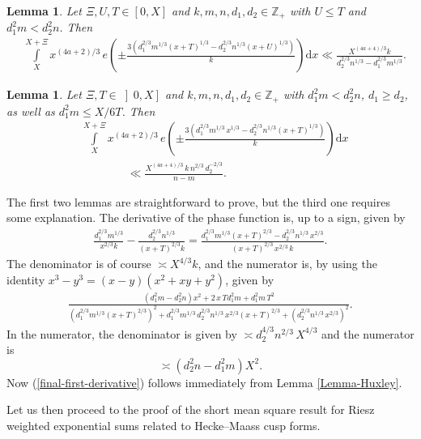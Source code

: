 \documentclass[a4paper,10pt,twoside]{amsart}
\newtheorem{lemma}[theorem]{Lemma}
\theoremstyle{definition}
\numberwithin{equation}{section}
\renewcommand\:{\colon}
\begin{document}
\begin{lemma}\label{first-derivative-2}
Let $\Xi,U,T\in\left[0,X\right]$ and $k,m,n,d_1,d_2\in\mathbb Z_+$ with $U\leqslant T$ and $d_1^2m<d_2^2n$. Then
\begin{align*}
&\int\limits_X^{X+\Xi}x^{(4a+2)/3}\,e\!\left(\pm\frac{3\!\left(d_1^{2/3}m^{1/3}\left(x+T\right)^{1/3}-d_2^{2/3}n^{1/3}\left(x+U\right)^{1/3}\right)}k\right)\mathrm dx \ll\frac{X^{(4a+4)/3}k}{d_2^{2/3}n^{1/3}-d_1^{2/3}m^{1/3}}.
\end{align*}
\end{lemma}

\begin{lemma}\label{first-derivative-3}
Let $\Xi,T\in\left]0,X\right]$ and $k,m,n,d_1,d_2\in\mathbb Z_+$ with $d_1^2m<d_2^2n$, $d_1\geqslant d_2$, as well as $d_1^2 m\leqslant X/6T$. Then
\begin{align}\label{final-first-derivative}
&\int\limits_X^{X+\Xi}x^{(4a+2)/3}\,e\!\left(\pm\frac{3\!\left(d_1^{2/3}m^{1/3}\,x^{1/3}-d_2^{2/3}n^{1/3}\left(x+T\right)^{1/3}\right)}k\right)\mathrm dx \nonumber \\
&\qquad\qquad\ll\frac{X^{(4a+4)/3}\,k\,n^{2/3}\,d_2^{-2/3}}{n-m}.
\end{align}
\end{lemma}

\noindent The first two lemmas are straightforward to prove, but the third one requires some explanation. The derivative of the phase function is, up to a sign, given by
\begin{align*}
\frac{d_1^{2/3}m^{1/3}}{x^{2/3}k}-\frac{d_2^{2/3}n^{1/3}}{(x+T)^{2/3}k}
=\frac{d_1^{2/3}m^{1/3}\left(x+T\right)^{2/3}-d_2^{2/3}n^{1/3}\,x^{2/3}}{\left(x+T\right)^{2/3}\,x^{2/3}\,k}.
\end{align*}
The denominator is of course $\asymp X^{4/3}k$, and the numerator is, by using the identity $x^3-y^3=(x-y)(x^2+xy+y^2)$, given by
\begin{align*}
\frac{\left(d_1^2m-d_2^2n\right)x^2+2\,x\,Td_1^2m+d_1^2m\,T^2}{\left(d_1^{2/3}m^{1/3}\left(x+T\right)^{2/3}\right)^2+
d_1^{2/3}m^{1/3}\,d_2^{2/3}n^{1/3}\,x^{2/3}\left(x+T\right)^{2/3}
+\left(d_2^{2/3}n^{1/3}\,x^{2/3}\right)^2}.
\end{align*}
In the numerator, the denominator is given by $\asymp d_2^{4/3}n^{2/3}\,X^{4/3}$ and the numerator is
\[\asymp\left(d_2^2n-d_1^2m\right)X^2.\]
Now (\ref{final-first-derivative}) follows immediately from Lemma \ref{Lemma-Huxley}.

Let us then proceed to the proof of the short mean square result for Riesz weighted exponential sums related to Hecke--Maass cusp forms. 
\end{document}
